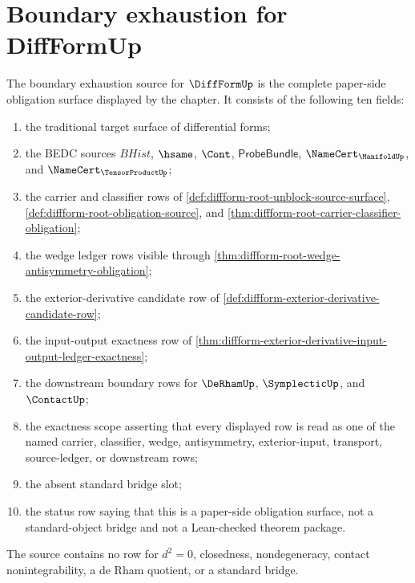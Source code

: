 \section{Boundary exhaustion for DiffFormUp}
\label{sec:diffform-boundary-exhaustion}

\begin{definition}
\label{def:diffform-boundary-exhaustion-source}
The boundary exhaustion source for $\DiffFormUp$ is the complete paper-side
obligation surface displayed by the chapter. It consists of the following ten
fields:
\begin{enumerate}
  \item the traditional target surface of differential forms;
  \item the BEDC sources $BHist$, $\hsame$, $\Cont$, $\mathsf{ProbeBundle}$,
  $\NameCert_{\ManifoldUp}$, and $\NameCert_{\TensorProductUp}$;
  \item the carrier and classifier rows of
  \autoref{def:diffform-root-unblock-source-surface},
  \autoref{def:diffform-root-obligation-source}, and
  \autoref{thm:diffform-root-carrier-classifier-obligation};
  \item the wedge ledger rows visible through
  \autoref{thm:diffform-root-wedge-antisymmetry-obligation};
  \item the exterior-derivative candidate row of
  \autoref{def:diffform-exterior-derivative-candidate-row};
  \item the input-output exactness row of
  \autoref{thm:diffform-exterior-derivative-input-output-ledger-exactness};
  \item the downstream boundary rows for $\DeRhamUp$, $\SymplecticUp$, and
  $\ContactUp$;
  \item the exactness scope asserting that every displayed row is read as one
  of the named carrier, classifier, wedge, antisymmetry, exterior-input,
  transport, source-ledger, or downstream rows;
  \item the absent standard bridge slot;
  \item the status row saying that this is a paper-side obligation surface,
  not a standard-object bridge and not a Lean-checked theorem package.
\end{enumerate}
The source contains no row for $d^2=0$, closedness, nondegeneracy, contact
nonintegrability, a de Rham quotient, or a standard bridge.
\end{definition}

